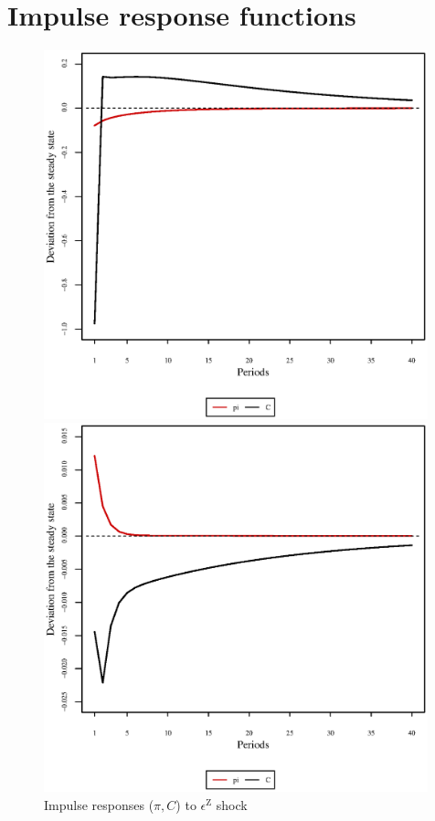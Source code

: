 \pagebreak

\section{Impulse response functions}

\begin{figure}[h]
\begin{minipage}{0.5\textwidth}
\vspace*{-3em}
\centering
\includegraphics[width=0.99\textwidth, scale=0.55]{plots/plot_76.eps}
\caption{Impulse responses ($\pi, C$) to $\epsilon^{\mathrm{Z}}$ shock}
\end{minipage}
\begin{minipage}{0.5\textwidth}
\vspace*{-3em}
\centering
\includegraphics[width=0.99\textwidth, scale=0.55]{plots/plot_77.eps}

\end{minipage}
\end{figure}
